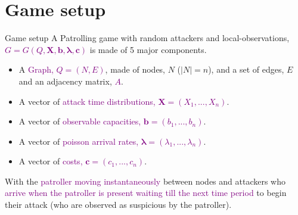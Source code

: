 \documentclass[10pt]{beamer}
\begin{document}
\section{Game setup}
\begin{frame}{Game setup}
A Patrolling game with random attackers and local-observations, \textcolor{purple}{$G=G(Q,\bm{X},\bm{b},\bm{\lambda},\bm{c})$} is made of 5 major components.
\begin{itemize}
\item A \textcolor{purple}{Graph, $Q=(N,E)$}, made of nodes, $N$ ($|N|=n$), and a set of edges, $E$ and an adjacency matrix, \textcolor{purple}{$A$}.
\item A vector of \textcolor{purple}{attack time distributions, $\bm{X}=(X_{1},...,X_{n})$}.
\item A vector of \textcolor{purple}{observable capacities, $\bm{b}=(b_{1},...,b_{n})$}.
\item A vector of \textcolor{purple}{poisson arrival rates, $\bm{\lambda}=(\lambda_{1},...,\lambda_{n})$}.
\item A vector of \textcolor{purple}{costs, $\bm{c}=(c_{1},...,c_{n})$}.
\end{itemize}

\pause

With the \textcolor{purple}{patroller moving instantaneously} between nodes and attackers who \textcolor{purple}{arrive when the patroller is present waiting till the next time period} to begin their attack (who are observed as suspicious by the patroller).
\end{frame}
\end{document}
